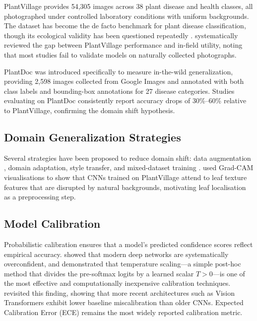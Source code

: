 \documentclass[pdflatex,sn-mathphys-num]{sn-jnl}
\theoremstyle{thmstyleone}%
\theoremstyle{thmstyletwo}%
\theoremstyle{thmstylethree}%
\begin{document}
PlantVillage \citep{hughes2015plantvillage} provides 54{,}305 images across 38 plant
disease and health classes, all photographed under controlled laboratory conditions with
uniform backgrounds. The dataset has become the de facto benchmark for plant disease
classification, though its ecological validity has been questioned repeatedly
\citep{barbedo2016review,toda2019deep}. \citet{dsouza2023generalization} systematically
reviewed the gap between PlantVillage performance and in-field utility, noting that most
studies fail to validate models on naturally collected photographs.

PlantDoc \citep{singh2020plant} was introduced specifically to measure in-the-wild
generalization, providing 2{,}598 images collected from Google Images and annotated with
both class labels and bounding-box annotations for 27 disease categories. Studies
evaluating on PlantDoc consistently report accuracy drops of 30\%--60\% relative to
PlantVillage, confirming the domain shift hypothesis.

\subsection{Domain Generalization Strategies}

Several strategies have been proposed to reduce domain shift: data augmentation
\citep{shorten2019survey}, domain adaptation, style transfer, and mixed-dataset
training \citep{kwak2023effect}. \citet{toda2019deep} used Grad-CAM visualisations
\citep{selvaraju2017gradcam} to show that CNNs trained on PlantVillage attend to leaf
texture features that are disrupted by natural backgrounds, motivating leaf localisation
as a preprocessing step.

\subsection{Model Calibration}

Probabilistic calibration ensures that a model's predicted confidence scores reflect
empirical accuracy. \citet{guo2017calibration} showed that modern deep networks are
systematically overconfident, and demonstrated that temperature scaling---a simple
post-hoc method that divides the pre-softmax logits by a learned scalar $T > 0$---is
one of the most effective and computationally inexpensive calibration techniques.
\citet{minderer2021calibration} revisited this finding, showing that more recent
architectures such as Vision Transformers exhibit lower baseline miscalibration than
older CNNs. Expected Calibration Error (ECE) \citep{niculescu2005calibration} remains
the most widely reported calibration metric.
\end{document}
